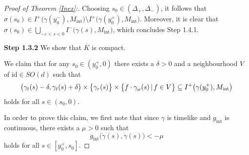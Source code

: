 \documentclass[reqno]{article}
\newcommand{\Mint}{M_{\mathrm{int}}}
\newcommand{\gint}{g_{\mathrm{int}}}
\begin{document}
\begin{proof}[Proof of Theorem \ref{Inex}:]
Choosing $s_0 \in (\Delta_+,\Delta_-)$, it follows that $\sigma(s_0) \in   I^+\big(\gamma(y^-_0),\Mint\big)  \setminus I^+\big(\gamma(y^+_0),\Mint\big)$. Moreover, it is clear that $\sigma(s_0) \in \bigcup_{-\varepsilon < s < 0} I^-\big(\gamma(s), \Mint \big)$, which concludes Step 1.4.1.
\vspace*{2mm}


\textbf{Step 1.3.2} We show that $\overline{K}$ is compact.
\vspace*{2mm}

We claim that for any $s_0 \in (y^+_0,0)$ there exists a $\delta >0$ and a neighbourhood $V$ of $\mathrm{id} \in SO(d)$ such that
\begin{equation*}
\big(\gamma_t(s) - \delta, \gamma_t(s) + \delta\big) \times \big{\{}\gamma_r(s)\big{\}} \times \big{\{}f \cdot \gamma_\omega(s) \, | \, f \in V\big{\}} \subseteq I^+\big(\gamma(y^+_0),\Mint\big)
\end{equation*}
holds for all $s \in (s_0,0)$.




In order to prove this claim, we first note that since $\gamma$ is timelike and $\gint$ is continuous, there exists a $\mu >0$ such that 
\begin{equation}
\label{UniformTimelike}
\gint\big(\dot{\gamma}(s), \dot{\gamma}(s)\big) < - \mu
\end{equation}
holds for all $s \in [y^+_0,s_0]$.


\end{proof}
\end{document}
